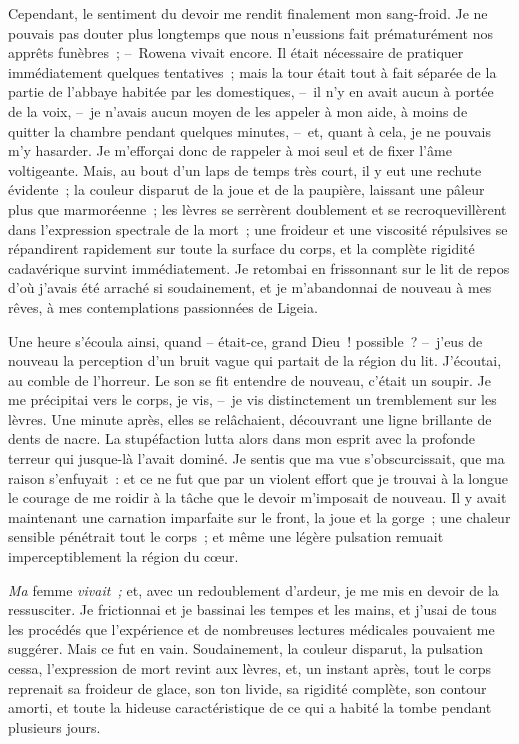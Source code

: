 \documentclass[french,twoside]{book} %
\begin{document}
Cependant, le sentiment du devoir me rendit finalement mon sang-froid. Je ne pouvais pas douter plus longtemps que nous n’eussions fait prématurément nos apprêts funèbres ; – Rowena vivait encore. Il était nécessaire de pratiquer immédiatement quelques tentatives ; mais la tour était tout à fait séparée de la partie de l’abbaye habitée par les domestiques, – il n’y en avait aucun à portée de la voix, – je n’avais aucun moyen de les appeler à mon aide, à moins de quitter la chambre pendant quelques minutes, – et, quant à cela, je ne pouvais m’y hasarder. Je m’efforçai donc de rappeler à moi seul et de fixer l’âme voltigeante. Mais, au bout d’un laps de temps très court, il y eut une rechute évidente ; la couleur disparut de la joue et de la paupière, laissant une pâleur plus que marmoréenne ; les lèvres se serrèrent doublement et se recroquevillèrent dans l’expression spectrale de la mort ; une froideur et une viscosité répulsives se répandirent rapidement sur toute la surface du corps, et la complète rigidité cadavérique survint immédiatement. Je retombai en frissonnant sur le lit de repos d’où j’avais été arraché si soudainement, et je m’abandonnai de nouveau à mes rêves, à mes contemplations passionnées de Ligeia.\par
Une heure s’écoula ainsi, quand – était-ce, grand Dieu ! possible ? – j’eus de nouveau la perception d’un bruit vague qui partait de la région du lit. J’écoutai, au comble de l’horreur. Le son se fit entendre de nouveau, c’était un soupir. Je me précipitai vers le corps, je vis, – je vis distinctement un tremblement sur les lèvres. Une minute après, elles se relâchaient, découvrant une ligne brillante de dents de nacre. La stupéfaction lutta alors dans mon esprit avec la profonde terreur qui jusque-là l’avait dominé. Je sentis que ma vue s’obscurcissait, que ma raison s’enfuyait : et ce ne fut que par un violent effort que je trouvai à la longue le courage de me roidir à la tâche que le devoir m’imposait de nouveau. Il y avait maintenant une carnation imparfaite sur le front, la joue et la gorge ; une chaleur sensible pénétrait tout le corps ; et même une légère pulsation remuait imperceptiblement la région du cœur.\par
\emph{Ma} femme \emph{vivait ;} et, avec un redoublement d’ardeur, je me mis en devoir de la ressusciter. Je frictionnai et je bassinai les tempes et les mains, et j’usai de tous les procédés que l’expérience et de nombreuses lectures médicales pouvaient me suggérer. Mais ce fut en vain. Soudainement, la couleur disparut, la pulsation cessa, l’expression de mort revint aux lèvres, et, un instant après, tout le corps reprenait sa froideur de glace, son ton livide, sa rigidité complète, son contour amorti, et toute la hideuse caractéristique de ce qui a habité la tombe pendant plusieurs jours.\par
\end{document}
